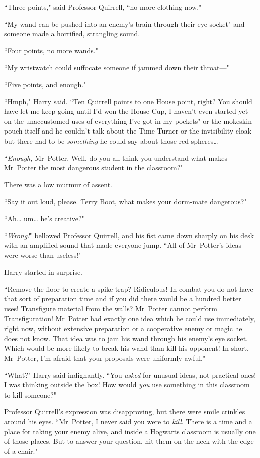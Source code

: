 ``Three points," said Professor Quirrell, ``no more clothing now."

``My wand can be pushed into an enemy's brain through their eye socket" and someone made a horrified, strangling sound.

``Four points, no more wands."

``My wristwatch could suffocate someone if jammed down their throat—"

``Five points, and enough."

``Hmph," Harry said. ``Ten Quirrell points to one House point, right? You should have let me keep going until I'd won the House Cup, I haven't even started yet on the unaccustomed uses of everything I've got in my pockets" or the mokeskin pouch itself and he couldn't talk about the Time-Turner or the invisibility cloak but there had to be \emph{something} he could say about those red spheres{\ldots}

``\emph{Enough,} Mr~Potter. Well, do you all think you understand what makes Mr~Potter the most dangerous student in the classroom?"

There was a low murmur of assent.

``Say it out loud, please. Terry Boot, what makes your dorm-mate dangerous?"

``Ah{\ldots} um{\ldots} he's creative?"

``\emph{Wrong!}" bellowed Professor Quirrell, and his fist came down sharply on his desk with an amplified sound that made everyone jump. ``All of Mr~Potter's ideas were worse than useless!"

Harry started in surprise.

``Remove the floor to create a spike trap? Ridiculous! In combat you do not have that sort of preparation time and if you did there would be a hundred better uses! Transfigure material from the walls? Mr~Potter cannot perform Transfiguration! Mr~Potter had exactly one idea which he could use immediately, right now, without extensive preparation or a cooperative enemy or magic he does not know. That idea was to jam his wand through his enemy's eye socket. Which would be more likely to break his wand than kill his opponent! In short, Mr~Potter, I'm afraid that your proposals were uniformly awful."

``What?" Harry said indignantly. ``You \emph{asked} for unusual ideas, not practical ones! I was thinking outside the box! How would \emph{you} use something in this classroom to kill someone?"

Professor Quirrell's expression was disapproving, but there were smile crinkles around his eyes. ``Mr~Potter, I never said you were to \emph{kill}. There is a time and a place for taking your enemy alive, and inside a Hogwarts classroom is usually one of those places. But to answer your question, hit them on the neck with the edge of a chair."

